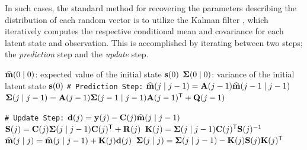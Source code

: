 \documentclass[10pt]{article}
\numberwithin{equation}{section}
\begin{document}
In such cases, the standard method for recovering the parameters describing the distribution of each random vector is to utilize the Kalman filter \citep{Kalman-Filter-1960}, which iteratively computes the respective conditional mean and covariance for each latent state and observation. This is accomplished by iterating between two steps; the \emph{prediction} step and the \emph{update} step.


\begin{algorithm}
    \caption{The Kalman Filter \citep{Kalman-Filter-1960}}
    \label{alg:kalman-filter}
    
    \begin{algorithmic}[1]
        \Require
            \Statex \hspace{\algorithmicindent} $\widehat{\mathbf{m}}(0 \mid 0)$: expected value of the initial state $\mathbf{s}(0)$       
            \Statex \hspace{\algorithmicindent} $\bm{\Sigma}(0 \mid 0)$: variance of the initial latent state $\mathbf{s}(0)$
            \Statex \texttt{\# Prediction Step:}
            \State $\widehat{\mathbf{m}}(j \mid j-1) = \mathbf{A}(j-1)\widehat{\mathbf{m}}(j-1 \mid j-1)$
            \State $\bm{\Sigma}(j \mid j-1) = \mathbf{A}(j-1)\bm{\Sigma}(j-1 \mid j-1)\mathbf{A}(j-1)^{\scriptstyle{\mathsf{T}}} + \mathbf{Q}(j-1)$

            \Statex \texttt{\# Update Step:}
            \State $\mathbf{d}(j) = \mathbf{y}(j) - \mathbf{C}(j)\widehat{\mathbf{m}}(j \mid j-1)$
            \State $\mathbf{S}(j) = \mathbf{C}(j)\bm{\Sigma}(j \mid j-1)\mathbf{C}(j)^{\scriptstyle{\mathsf{T}}} + \mathbf{R}(j)$
            \State $\mathbf{K}(j) = \bm{\Sigma}(j \mid j-1)\mathbf{C}(j)^{\scriptstyle{\mathsf{T}}}\mathbf{S}(j)^{-1}$ 
            \State $\widehat{\mathbf{m}}(j \mid j) = \widehat{\mathbf{m}}(j \mid j-1) + \mathbf{K}(j)\mathbf{d}(j)$
            \State $\bm{\Sigma}(j \mid j) = \bm{\Sigma}(j \mid j-1) - \mathbf{K}(j)\mathbf{S}(j)\mathbf{K}(j)^{\scriptstyle{\mathsf{T}}}$
        \EndFor
    \end{algorithmic}
\end{algorithm}
\end{document}
